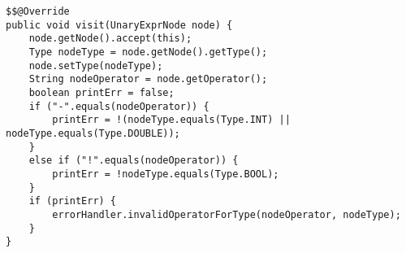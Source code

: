 \begin{lstlisting}[caption={Visit unary expression node in type checker}, label={code:TC:Unary}]
$$@Override
public void visit(UnaryExprNode node) {
    node.getNode().accept(this);
    Type nodeType = node.getNode().getType();
    node.setType(nodeType);
    String nodeOperator = node.getOperator();
    boolean printErr = false;
    if ("-".equals(nodeOperator)) {
        printErr = !(nodeType.equals(Type.INT) || nodeType.equals(Type.DOUBLE));
    } 
    else if ("!".equals(nodeOperator)) {
        printErr = !nodeType.equals(Type.BOOL);
    }
    if (printErr) {
        errorHandler.invalidOperatorForType(nodeOperator, nodeType);
    }
}
\end{lstlisting}